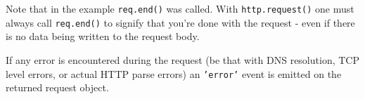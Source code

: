 \begin{Shaded}
\begin{Highlighting}[]
 
  \NormalTok{: }\NormalTok{,}
  \NormalTok{: }\NormalTok{,}
  \NormalTok{: }\NormalTok{,}
  \NormalTok{: }
\NormalTok{\};}

 
  \NormalTok{(} \NormalTok{+ }\NormalTok{);}
  \NormalTok{(} \NormalTok{+ }\NormalTok{(}\NormalTok{));}
  \NormalTok{(}\NormalTok{);}
  \NormalTok{(}\NormalTok{, } 
    \NormalTok{(} 
  \NormalTok{\});}
\NormalTok{\});}

\NormalTok{(}\NormalTok{, }
  \NormalTok{(} \NormalTok{+ }\NormalTok{);}
\NormalTok{\});}

\NormalTok{(}\NormalTok{);}
\NormalTok{(}\NormalTok{);}
\NormalTok{();}
\end{Highlighting}
\end{Shaded}

Note that in the example \texttt{req.end()} was called. With
\texttt{http.request()} one must always call \texttt{req.end()} to
signify that you're done with the request - even if there is no data
being written to the request body.

If any error is encountered during the request (be that with DNS
resolution, TCP level errors, or actual HTTP parse errors) an
\texttt{'error'} event is emitted on the returned request object.

